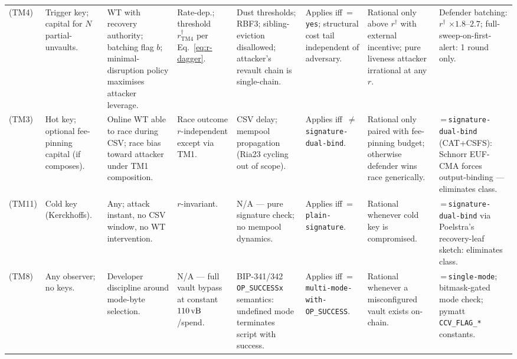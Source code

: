 \begin{table}[t]
\begin{tabular}{@{}p{0.9cm}p{1.55cm}p{1.55cm}p{1.55cm}p{1.55cm}p{1.55cm}p{1.55cm}p{1.55cm}@{}}
\\
\classscale{} (TM4) &
  Trigger key; capital for $N$ partial-unvaults. &
  WT with recovery authority; batching flag $b$; minimal-disruption policy maximises attacker leverage. &
  Rate-dep.; threshold $r^\dagger_{\mathrm{TM4}}$ per Eq.~\ref{eq:r-dagger}. &
  Dust thresholds; RBF3; sibling-eviction disallowed; attacker's revault chain is single-chain. &
  Applies iff \axrevault{}\,=\,\texttt{yes}; structural cost tail independent of adversary. &
  Rational only above $r^\dagger$ with external incentive; pure liveness attacker irrational at any $r$. &
  Defender batching: $r^\dagger$ $\times 1.8$--$2.7$; full-sweep-on-first-alert: 1 round only.
\\
\classhot{} (TM3) &
  Hot key; optional fee-pinning capital (if \classfee{} composes). &
  Online WT able to race during CSV; race bias toward attacker under TM1 composition. &
  Race outcome $r$-independent except via TM1. &
  CSV delay; mempool propagation (Ria23 cycling out of scope). &
  Applies iff \axwdbind{}\,$\neq$\,\texttt{signature-dual-bind}. &
  Rational only paired with fee-pinning budget; otherwise defender wins race generically. &
  \axwdbind{}\,=\,\texttt{signature-dual-bind} (CAT+CSFS): Schnorr EUF-CMA forces output-binding --- eliminates class.
\\
\classcold{} (TM11) &
  Cold key (Kerckhoffs). &
  Any; attack instant, no CSV window, no WT intervention. &
  $r$-invariant. &
  N/A --- pure signature check; no mempool dynamics. &
  Applies iff \axrecbind{}\,=\,\texttt{plain-signature}. &
  Rational whenever cold key is compromised. &
  \axrecbind{}\,=\,\texttt{signature-dual-bind} via Poelstra's \catcsfs{} recovery-leaf sketch: eliminates class.
\\
\classmode{} (TM8) &
  Any observer; no keys. &
  Developer discipline around mode-byte selection. &
  N/A --- full vault bypass at constant $110\text{\,vB}{}$/spend. &
  BIP-341/342 \texttt{OP\_SUCCESSx} semantics: undefined mode terminates script with success. &
  Applies iff \axopsurf{}\,=\,\texttt{multi-mode-with-OP\_SUCCESS}. &
  Rational whenever a misconfigured vault exists on-chain. &
  \axopsurf{}\,=\,\texttt{single-mode}; bitmask-gated mode check; pymatt \texttt{CCV\_FLAG\_*} constants.
\\
\bottomrule
\end{tabular}
\end{table}

\providecommand{\todo}[2][]{\textbf{[TODO: #2]}}
